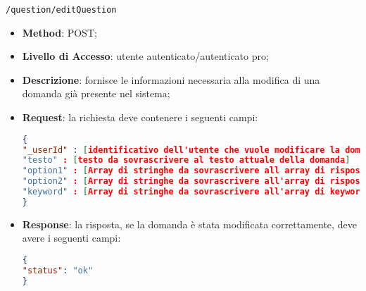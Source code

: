 	\item \texttt{/question/editQuestion}
		\begin{itemize}
			\item \textbf{Method}: POST;
			\item \textbf{Livello di Accesso}: utente autenticato/autenticato pro;
			\item \textbf{Descrizione}: fornisce le informazioni necessaria alla modifica di una domanda già presente nel sistema;
			\item \textbf{Request}: la richiesta deve contenere i seguenti campi:
\begin{lstlisting}[language=json,firstnumber=1]
{
"_userId" : [identificativo dell'utente che vuole modificare la domanda]
"testo" : [testo da sovrascrivere al testo attuale della domanda]
"option1" : [Array di stringhe da sovrascrivere all array di risposte attuale della domanda]
"option2" : [Array di stringhe da sovrascrivere all'array di risposte corrette della domanda]
"keyword" : [Array di stringhe da sovrascrivere all'array di keyword attuali della domanda]
}
\end{lstlisting}
			\item \textbf{Response}: la risposta, se la domanda è stata modificata correttamente, deve avere i seguenti campi:
\begin{lstlisting}[language=json,firstnumber=1]
{
"status": "ok"
}
\end{lstlisting}
		\end{itemize}